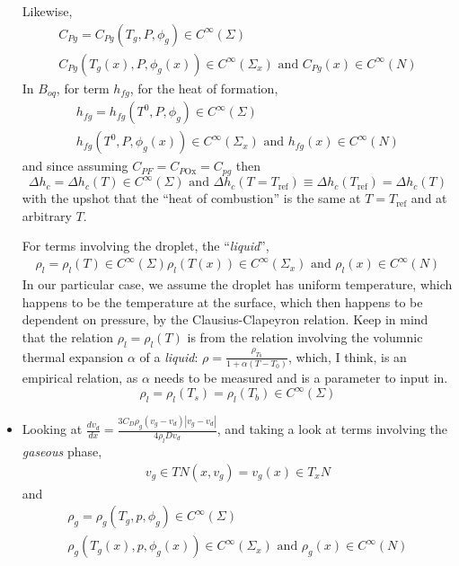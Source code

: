 \documentclass[10pt]{amsart}
\begin{document}
\begin{multicols*}{2}
\begin{itemize}
Likewise,
\[
\begin{gathered}
  C_{Pg} = C_{Pg}(T_g,P,\phi_g) \in C^{\infty}(\Sigma) \\ 
  C_{Pg}(T_g(x), P, \phi_g(x)) \in C^{\infty}(\Sigma_x) \text{ and } C_{Pg}(x) \in C^{\infty}(N)
\end{gathered}
\]
In $B_{oq}$, for term $h_{fg}$, for the heat of formation,
\[
\begin{gathered}
h_{fg} = h_{fg}(T^0, P, \phi_g) \in C^{\infty}(\Sigma) \\
h_{fg}(T^0,P,\phi_g(x)) \in C^{\infty}(\Sigma_x) \text{ and } h_{fg}(x) \in C^{\infty}(N)
\end{gathered}
\]
and since assuming $C_{PF} = C_{P\text{Ox}} = C_{pg}$ then
\[
\Delta h_c =\Delta h_c(T) \in C^{\infty}(\Sigma) \text{ and } \Delta h_c(T=T_{\text{ref}}) \equiv \Delta h_c(T_{\text{ref}}) = \Delta h_c(T)
\]
with the upshot that the ``heat of combustion'' is the same at $T=T_{\text{ref}}$ and at arbitrary $T$.  

For terms involving the droplet, the ``\emph{liquid}'',
\[
\begin{gathered}
  \rho_l = \rho_l(T) \in C^{\infty}(\Sigma) 
  \rho_l(T(x)) \in C^{\infty}(\Sigma_x) \text{ and } \rho_l(x) \in C^{\infty}(N)
\end{gathered}
\]
In our particular case, we assume the droplet has uniform temperature, which happens to be the temperature at the surface, which then happens to be dependent on pressure, by the Clausius-Clapeyron relation.  Keep in mind that the relation $\rho_l = \rho_l(T)$ is from the relation involving the volumnic thermal expansion $\alpha$ of a \emph{liquid}: $\rho = \frac{\rho_{T_0}}{ 1 + \alpha (T-T_0)}$, which, I think, is an empirical relation, as $\alpha$ needs to be measured and is a parameter to input in.  
\[
\rho_l = \rho_l(T_s) = \rho_l(T_b)\in C^{\infty}(\Sigma) 
\]

\item Looking at $\frac{dv_d}{dx} = \frac{3C_D \rho_g (v_g-v_d)|v_g-v_d| }{ 4\rho_l Dv_d}$, and taking a look at terms involving the \emph{gaseous} phase,
\[
\begin{gathered}
  v_g \in TN
  (x,v_g) = v_g(x) \in T_xN
\end{gathered}
\]
and 
\[
\begin{gathered}
  \rho_g = \rho_g(T_g,p,\phi_g) \in C^{\infty}(\Sigma) \\ 
  \rho_g(T_g(x),p, \phi_g(x)) \in C^{\infty}(\Sigma_x) \text{ and } \rho_g(x) \in C^{\infty}(N)
\end{gathered}
\]


\end{itemize}
\end{multicols*}
\end{document}

